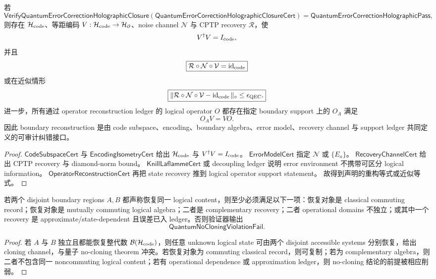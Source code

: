 \begin{theorem}[量子纠错重构的可靠性]\label{thm:typed-address-biaxial-completion-qec-reconstruction-soundness}
若
\[
\mathsf{VerifyQuantumErrorCorrectionHolographicClosure}
(\mathsf{QuantumErrorCorrectionHolographicClosureCert})
=
\mathsf{QuantumErrorCorrectionHolographicPass},
\]
则存在 \(\mathcal H_{\rm code}\)、等距编码 \(V:\mathcal H_{\rm code}\to\mathcal H_\partial\)、noise channel \(\mathcal N\) 与 CPTP recovery \(\mathcal R\)，使
\[
V^\dagger V=I_{\rm code},
\]
并且
\[
\boxed{
\mathcal R\circ\mathcal N\circ\mathcal V
=
\operatorname{id}_{\rm code}
}
\]
或在近似情形
\[
\boxed{
\|
\mathcal R\circ\mathcal N\circ\mathcal V
-
\operatorname{id}_{\rm code}
\|_\diamond
\le
\epsilon_{\rm QEC}.
}
\]
进一步，所有通过 operator reconstruction ledger 的 logical operator \(O\) 都存在指定 boundary support 上的 \(O_A\) 满足
\[
\boxed{
O_A V=VO.
}
\]
因此 boundary reconstruction 是由 code subspace、encoding、boundary algebra、error model、recovery channel 与 support ledger 共同定义的可审计纠错接口。
\end{theorem}

\begin{proof}
\(\mathsf{CodeSubspaceCert}\) 与 \(\mathsf{EncodingIsometryCert}\) 给出 \(\mathcal H_{\rm code}\) 与 \(V^\dagger V=I_{\rm code}\)。
\(\mathsf{ErrorModelCert}\) 指定 \(\mathcal N\) 或 \(\{E_a\}\)。
\(\mathsf{RecoveryChannelCert}\) 给出 CPTP recovery 与 diamond-norm bound。
\(\mathsf{KnillLaflammeCert}\) 或 decoupling ledger 说明 error environment 不携带可区分 logical information。
\(\mathsf{OperatorReconstructionCert}\) 再把 state recovery 推到 logical operator support statement。
故得到声明的重构等式或近似等式。
\end{proof}

\begin{theorem}\label{thm:typed-address-biaxial-completion-no-cloning-compatibility}
若两个 disjoint boundary regions \(A,B\) 都声称恢复同一 logical content，则至少必须满足以下一项：恢复对象是 classical commuting record；恢复对象是 mutually commuting logical algebra；二者是 complementary recovery；二者 operational domains 不独立；或其中一个 recovery 是 approximate/state-dependent 且误差已入 ledger。否则验证器输出
\[
\boxed{
\mathsf{QuantumNoCloningViolationFail}.
}
\]
\end{theorem}

\begin{proof}
若 \(A\) 与 \(B\) 独立且都能恢复整代数 \(\mathcal B(\mathcal H_{\rm code})\)，则任意 unknown logical state 可由两个 disjoint accessible systems 分别恢复，给出 cloning channel，与量子 no-cloning theorem 冲突。若恢复对象为 commuting classical record，则可复制；若为 complementary algebra，则二者不包含同一 noncommuting logical content；若有 operational dependence 或 approximation ledger，则 no-cloning 结论的前提被相应削弱。
\end{proof}

